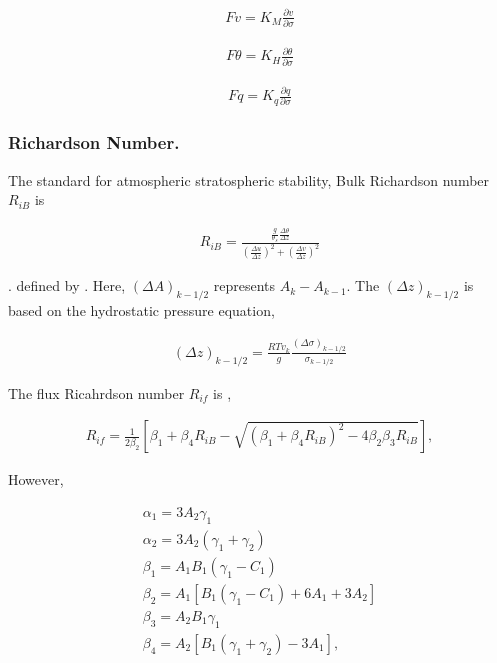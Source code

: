 \begin{eqnarray}
  F{v} = K_M \frac{\partial v}{\partial \sigma} 
\end{eqnarray}

\begin{eqnarray}
  F{\theta} = K_H \frac{\partial \theta}{\partial \sigma} 
\end{eqnarray}

\begin{eqnarray}
  F{q} = K_q \frac{\partial q}{\partial \sigma} 
\end{eqnarray}

\hypertarget{richardson-number.}{%
\subsubsection{Richardson Number.}\label{richardson-number.}}

The standard for atmospheric stratospheric stability, Bulk Richardson
number \(R_{iB}\) is

\begin{eqnarray}
R_{iB} = \frac{\displaystyle 
               \frac{g}{\theta_s} \frac{\Delta \theta}{\Delta z} }
              {\displaystyle
                  \left( \frac{\Delta u}{\Delta z} \right)^2 
                + \left( \frac{\Delta v}{\Delta z} \right)^2      }
\end{eqnarray}

. defined by . Here, \((\Delta A)_{k-1/2}\) represents
\(A_{k} - A_{k-1}\). The \((\Delta z)_{k-1/2}\) is based on the
hydrostatic pressure equation,

\begin{eqnarray}
(\Delta z)_{k-1/2} = \frac{R Tv_{k}}{g} 
                     \frac{(\Delta \sigma)_{k-1/2}}{\sigma_{k-1/2}}
\end{eqnarray}

The flux Ricahrdson number \(R_{if}\) is ,

\begin{eqnarray}
R_{if} = \frac{1}{2 \beta_2}
      \left[ \beta_1 + \beta_4 R_{iB}
              - \sqrt{ ( \beta_1 + \beta_4 R_{iB} )^2 
                       - 4 \beta_2 \beta_3 R_{iB} }
              \right] ,
\end{eqnarray}

However,

\begin{eqnarray}
\alpha_1  =  3 A_2 \gamma_1  \\
\alpha_2  =  3 A_2 (\gamma_1+\gamma_2) \\
\beta_1   =  A_1 B_1 ( \gamma_1 - C_1 ) \\
\beta_2   =  A_1 [ B_1 ( \gamma_1 - C_1 ) + 6 A_1 + 3 A_2 ] \\
\beta_3   =  A_2 B_1 \gamma_1 \\
\beta_4   =  A_2 [ B_1 ( \gamma_1 + \gamma_2 ) - 3 A_1 ] ,
\end{eqnarray}


